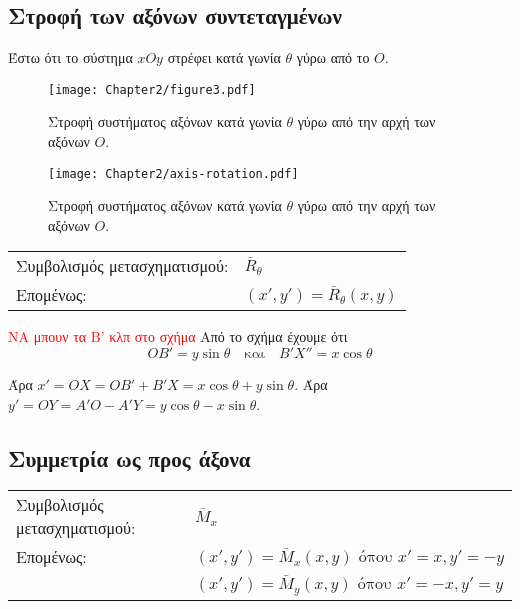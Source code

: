 


\subsection{Στροφή των αξόνων συντεταγμένων}
Έστω ότι το σύστημα $xOy$ στρέφει κατά γωνία $\theta$ γύρω από το $O$.

\begin{figure}[hbt]
  \begin{center}
	\texttt{[image: Chapter2/figure3.pdf]}
  \end{center}
  \caption{Στροφή συστήματος αξόνων κατά γωνία $\theta$ γύρω από την αρχή των αξόνων $O$.}
\end{figure}

\begin{figure}[h!]
  \begin{center}
	\texttt{[image: Chapter2/axis-rotation.pdf]}
  \end{center}
  \caption{Στροφή συστήματος αξόνων κατά γωνία $\theta$ γύρω από την αρχή των αξόνων $O$.}
\end{figure}



\begin{tabular}{m{}m{}}
	Συμβολισμός μετασχηματισμού: & $ \bar{R}_\theta $\\
	Επομένως: & $(x', y') = \bar{R}_\theta (x, y)$\\
\end{tabular}

\textcolor{red}{ΝΑ μπουν τα B' κλπ στο σχήμα}
Από το σχήμα έχουμε ότι 
\[
	OB' = y \sin\theta \quad \text{και} \quad B'X'' = x \cos\theta
\]

Άρα $x' = OX = OB' + B'X = x \cos\theta + y \sin\theta$.
Άρα $y' = OY = A'O - A'Y = y \cos\theta - x \sin\theta$.

\subsection{Συμμετρία ως προς άξονα}


\begin{tabular}{m{}m{}}
	Συμβολισμός μετασχηματισμού: & $ \bar{M}_x $\\
	Επομένως: & $(x',y') = \bar{M}_x(x,y) \text{ όπου } x' = x, y' = -y$\\
	& $(x',y') = \bar{M}_y(x,y) \text{ όπου } x' = -x, y' = y$
\end{tabular}


